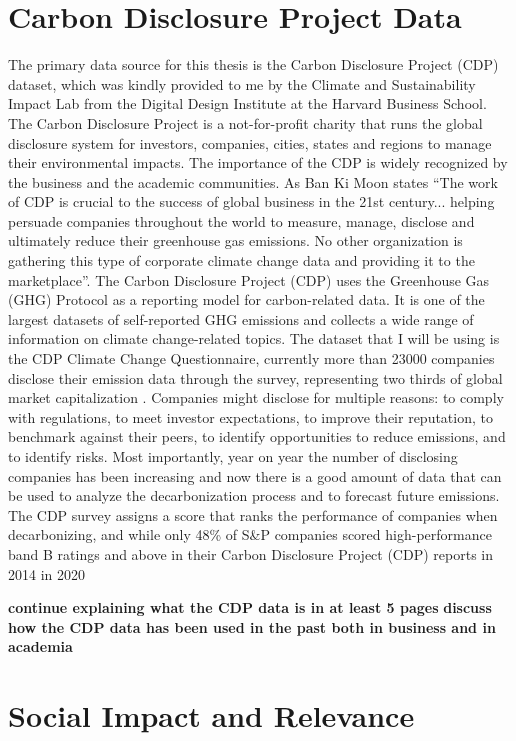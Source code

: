 \section{Carbon Disclosure Project Data}
The primary data source for this thesis is the Carbon Disclosure Project (CDP) dataset, which was kindly provided to me by the Climate and Sustainability Impact Lab from the Digital Design Institute at the Harvard Business School. The Carbon Disclosure Project is a not-for-profit charity that runs the global disclosure system for investors, companies, cities, states and regions to manage their environmental impacts. \cite{} The importance of the CDP is widely recognized by the business and the academic communities. As Ban Ki Moon states ``The work of CDP is crucial to the success of global business in the 21st century... helping persuade companies throughout the world to measure, manage, disclose and ultimately reduce their greenhouse gas emissions. No other organization is gathering this type of corporate climate change data and providing it to the marketplace''.
The Carbon Disclosure Project (CDP) uses the Greenhouse Gas (GHG) Protocol as a reporting model for carbon-related data. \cite{Andrew2011Accounting} It is one of the largest datasets of self-reported GHG emissions and collects a wide range of information on climate change-related topics. The dataset that I will be using is the CDP Climate Change Questionnaire,  currently more than 23000 companies disclose their emission data through the survey, representing two thirds of global market capitalization \cite{}. Companies might disclose for multiple reasons: to comply with regulations, to meet investor expectations, to improve their reputation, to benchmark against their peers, to identify opportunities to reduce emissions, and to identify risks. Most importantly, year on year the number of disclosing companies has been increasing and now there is a good amount of data that can be used to analyze the decarbonization process and to forecast future emissions. The CDP survey assigns a score that ranks the performance of companies when decarbonizing, and while only 48\% of S\&P companies scored high-performance band B ratings and above in their Carbon Disclosure Project (CDP) reports in 2014 \cite{Upadhyay2022Improving} in 2020

\textbf{continue explaining what the CDP data is in at least 5 pages}
\textbf{discuss how the CDP data has been used in the past both in business and in academia}
\section{Social Impact and Relevance}

